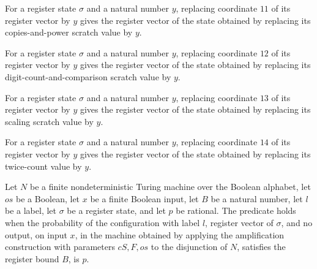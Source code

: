 \begin{lemma}
\label{Randomized.PolyAmp.Reg.u_11}
\leanok
{}
For a register state $\sigma$ and a natural number $y$, replacing coordinate $11$ of its
register vector by $y$ gives the register vector of the state obtained by replacing its
copies-and-power scratch value by $y$.
\end{lemma}

\begin{lemma}
\label{Randomized.PolyAmp.Reg.u_12}
\leanok
{}
For a register state $\sigma$ and a natural number $y$, replacing coordinate $12$ of its
register vector by $y$ gives the register vector of the state obtained by replacing its
digit-count-and-comparison scratch value by $y$.
\end{lemma}

\begin{lemma}
\label{Randomized.PolyAmp.Reg.u_13}
\leanok
{}
For a register state $\sigma$ and a natural number $y$, replacing coordinate $13$ of its
register vector by $y$ gives the register vector of the state obtained by replacing its
scaling scratch value by $y$.
\end{lemma}

\begin{lemma}
\label{Randomized.PolyAmp.Reg.u_14}
\leanok
{}
For a register state $\sigma$ and a natural number $y$, replacing coordinate $14$ of its
register vector by $y$ gives the register vector of the state obtained by replacing its
twice-count value by $y$.
\end{lemma}

\begin{definition}
\label{Randomized.PolyAmp.PS}
\leanok
{}
Let $N$ be a finite nondeterministic Turing machine over the Boolean alphabet, let $os$
be a Boolean, let $x$ be a finite Boolean input, let $B$ be a natural number, let $l$ be
a label, let $\sigma$ be a register state, and let $p$ be rational. The predicate holds
when the probability of the configuration with label $l$, register vector of $\sigma$,
and no output, on input $x$, in the machine obtained by applying the amplification
construction with parameters $cS,F,os$ to the disjunction of $N$, satisfies the register
bound $B$, is $p$.
\end{definition}

